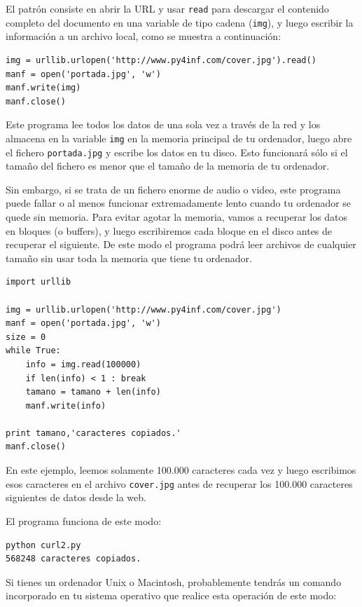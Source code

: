 El patrón consiste en abrir la URL y usar {\tt read} para descargar el contenido
completo del documento en una variable de tipo cadena ({\tt img}), y luego escribir la
información a un archivo local, como se muestra a continuación:

\beforeverb
\begin{verbatim}
img = urllib.urlopen('http://www.py4inf.com/cover.jpg').read()
manf = open('portada.jpg', 'w')
manf.write(img)
manf.close()
\end{verbatim}
\afterverb
%
Este programa lee todos los datos de una sola vez a través de la red y los
almacena en la variable {\tt img} en la memoria principal de tu ordenador,
luego abre el fichero {\tt portada.jpg} y escribe los datos en tu
disco. Esto funcionará sólo si el tamaño del fichero es menor que el tamaño
de la memoria de tu ordenador.

Sin embargo, si se trata de un fichero enorme de audio o video, este programa puede fallar
o al menos funcionar extremadamente lento cuando tu ordenador se quede sin memoria.
Para evitar agotar la memoria, vamos a recuperar los datos en bloques
(o buffers), y luego escribiremos cada bloque en el disco antes de recuperar
el siguiente. De este modo el programa podrá leer archivos de cualquier tamaño sin
usar toda la memoria que tiene tu ordenador.

\beforeverb
\begin{verbatim}
import urllib

img = urllib.urlopen('http://www.py4inf.com/cover.jpg')
manf = open('portada.jpg', 'w')
size = 0
while True:
    info = img.read(100000)
    if len(info) < 1 : break
    tamano = tamano + len(info)
    manf.write(info)

print tamano,'caracteres copiados.'
manf.close()
\end{verbatim}
\afterverb
%
En este ejemplo, leemos solamente 100.000 caracteres cada vez y luego
escribimos esos caracteres en el archivo {\tt cover.jpg}
antes de recuperar los 100.000 caracteres siguientes de datos desde
la web.

El programa funciona de este modo:

\beforeverb
\begin{verbatim}
python curl2.py 
568248 caracteres copiados.
\end{verbatim}
\afterverb
%

Si tienes un ordenador Unix o Macintosh, probablemente tendrás un comando
incorporado en tu sistema operativo que realice esta operación
de este modo:

